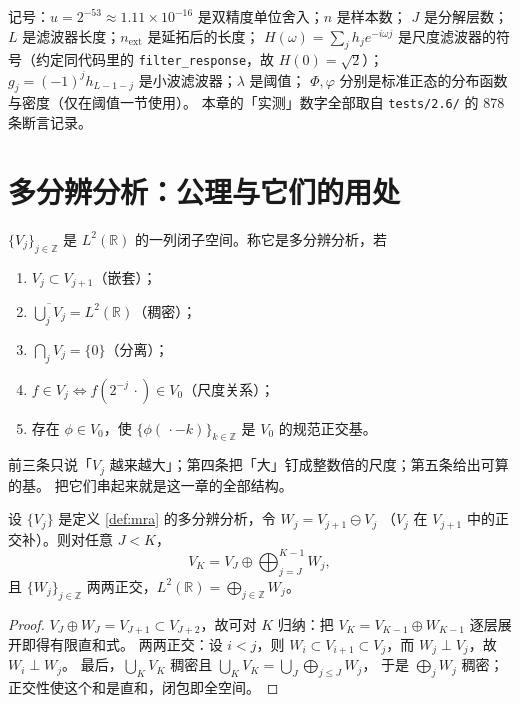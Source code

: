记号：$u=2^{-53}\approx1.11\times10^{-16}$ 是双精度单位舍入；$n$ 是样本数；
$J$ 是分解层数；$L$ 是滤波器长度；$n_{\text{ext}}$ 是延拓后的长度；
$H(\omega)=\sum_j h_j e^{-i\omega j}$ 是尺度滤波器的符号（约定同代码里的
\texttt{filter\_response}，故 $H(0)=\sqrt2$）；
$g_j=(-1)^j h_{L-1-j}$ 是小波滤波器；$\lambda$ 是阈值；
$\Phi,\varphi$ 分别是标准正态的分布函数与密度（仅在阈值一节使用）。
本章的「实测」数字全部取自 \texttt{tests/2.6/} 的 878 条断言记录。

\section{多分辨分析：公理与它们的用处}

\begin{definition}[多分辨分析]
\label{def:mra}
$\{V_j\}_{j\in\mathbb{Z}}$ 是 $L^2(\mathbb{R})$ 的一列闭子空间。称它是多分辨分析，若
\begin{enumerate}
  \item $V_j\subset V_{j+1}$（嵌套）；
  \item $\overline{\bigcup_j V_j}=L^2(\mathbb{R})$（稠密）；
  \item $\bigcap_j V_j=\{0\}$（分离）；
  \item $f\in V_j\iff f(2^{-j}\,\cdot)\in V_0$（尺度关系）；
  \item 存在 $\phi\in V_0$，使 $\{\phi(\,\cdot-k)\}_{k\in\mathbb{Z}}$ 是 $V_0$ 的规范正交基。
\end{enumerate}
\end{definition}

前三条只说「$V_j$ 越来越大」；第四条把「大」钉成整数倍的尺度；第五条给出可算的基。
把它们串起来就是这一章的全部结构。

\begin{theorem}[嵌套给出直和分解]
\label{thm:nested}
设 $\{V_j\}$ 是定义 \ref{def:mra} 的多分辨分析，令 $W_j=V_{j+1}\ominus V_j$
（$V_j$ 在 $V_{j+1}$ 中的正交补）。则对任意 $J<K$，
\[
V_K=V_J\oplus\bigoplus_{j=J}^{K-1}W_j ,
\]
且 $\{W_j\}_{j\in\mathbb{Z}}$ 两两正交，$L^2(\mathbb{R})=\bigoplus_{j\in\mathbb{Z}}W_j$。
\end{theorem}

\begin{proof}
$V_J\oplus W_J=V_{J+1}\subset V_{J+2}$，故可对 $K$ 归纳：把
$V_K=V_{K-1}\oplus W_{K-1}$ 逐层展开即得有限直和式。
两两正交：设 $i<j$，则 $W_i\subset V_{i+1}\subset V_j$，而 $W_j\perp V_j$，故 $W_i\perp W_j$。
最后，$\bigcup_K V_K$ 稠密且 $\bigcup_K V_K=\bigcup_J\bigoplus_{j\le J}W_j$，
于是 $\bigoplus_j W_j$ 稠密；正交性使这个和是直和，闭包即全空间。
\end{proof}

